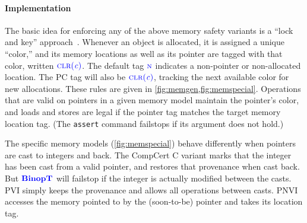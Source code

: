 \documentclass{llncs}
\begin{document}
\paragraph*{Implementation}

The basic idea for enforcing any of the above memory safety variants is a ``lock and key'' approach~\cite{Clause07:MemsafeTainting,Azevedo+15}.
Whenever an object is allocated, it is assigned a unique ``color,'' and its memory locations as well
as its pointer are tagged with that color, written \(\textnormal{\color{blue} \sc clr}{\color{blue}(\mathit{c})}\).
The default tag \(\textnormal{\color{blue} \sc n}\) indicates a non-pointer or non-allocated location.
The PC tag will also be \(\textnormal{\color{blue} \sc clr}{\color{blue}(\mathit{c})}\),
tracking the next available color for new allocations. These rules are given in \cref{fig:memgen,fig:memspecial}. Operations that are valid on pointers in a given memory model
maintain the pointer's color, and loads and stores are legal if the pointer tag matches
the target memory location tag. (The {\tt assert} command failstops if its argument does not hold.)

The specific memory models (\cref{fig:memspecial}) behave differently when pointers are cast to
integers and back.
The CompCert C variant marks that the integer has been cast from a valid pointer, and
restores that provenance when cast back. But \(\color{blue} \mathbf{BinopT}\) will failstop if the integer is
actually modified between the casts. PVI simply keeps the provenance and allows all operations
between casts. PNVI accesses the memory pointed to by the (soon-to-be) pointer and takes its
location tag.
\end{document}
